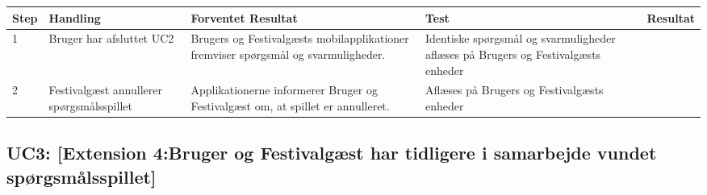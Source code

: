 \begin{longtable}{| p{0.7cm}  | p{3cm}  | p{4cm} |  p{3cm}  | p{3cm}  |}
\hline
Step & Handling & Forventet Resultat & Test & Resultat \\
\hline
1 &  Bruger har afsluttet UC2  &  Brugers og Festivalgæsts mobilapplikationer fremviser spørgsmål og svarmuligheder. & Identiske spørgsmål og svarmuligheder aflæses på Brugers og Festivalgæsts enheder &  \FuckingHuge{\checkmark} \\
\hline
2 &  Festivalgæst annullerer spørgsmålsspillet  & Applikationerne informerer Bruger og Festivalgæst om, at spillet er annulleret. & Aflæses på Brugers og Festivalgæsts enheder &   \FuckingHuge{\textdiv} \\
\hline
\end{longtable}



\subsection{UC3: [Extension 4:Bruger og Festivalgæst har tidligere i samarbejde vundet spørgsmålsspillet]}

